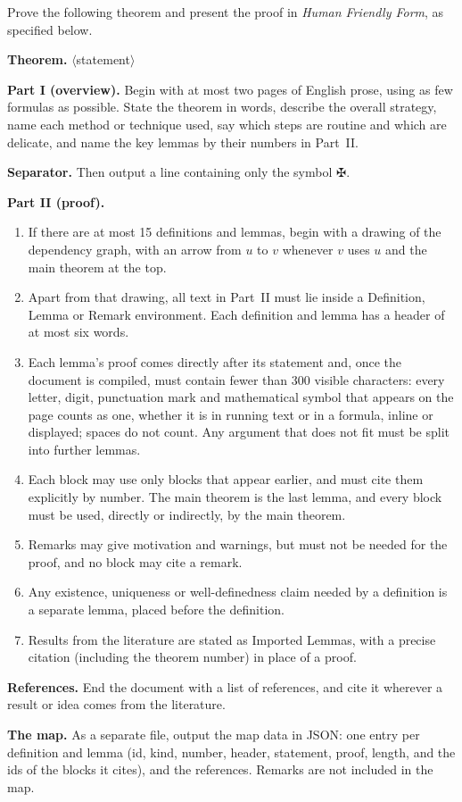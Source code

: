 \documentclass[11pt]{article}
\theoremstyle{plain}
\theoremstyle{definition}
\theoremstyle{remark}
\theoremstyle{definition}
\theoremstyle{plain}
\theoremstyle{remark}
\begin{document}
\begin{tcolorbox}[enhanced, breakable, colback=black!3, colframe=black!40, boxrule=0.5pt, arc=2pt, title={\small\textbf{Prompt template}}, coltitle=black, colbacktitle=black!10, fontupper=\small]
Prove the following theorem and present the proof in \emph{Human Friendly Form}, as specified below.

\smallskip
\textbf{Theorem.} $\langle$statement$\rangle$

\smallskip
\textbf{Part I (overview).} Begin with at most two pages of English prose, using as few formulas as possible. State the theorem in words, describe the overall strategy, name each method or technique used, say which steps are routine and which are delicate, and name the key lemmas by their numbers in Part~II.

\smallskip
\textbf{Separator.} Then output a line containing only the symbol $\maltese$.

\smallskip
\textbf{Part II (proof).}
\begin{enumerate}[leftmargin=1.6em, itemsep=1pt]
  \item If there are at most 15 definitions and lemmas, begin with a drawing of the dependency graph, with an arrow from $u$ to $v$ whenever $v$ uses $u$ and the main theorem at the top.
  \item Apart from that drawing, all text in Part~II must lie inside a Definition, Lemma or Remark environment. Each definition and lemma has a header of at most six words.
  \item Each lemma's proof comes directly after its statement and, once the document is compiled, must contain fewer than 300 visible characters: every letter, digit, punctuation mark and mathematical symbol that appears on the page counts as one, whether it is in running text or in a formula, inline or displayed; spaces do not count. Any argument that does not fit must be split into further lemmas.
  \item Each block may use only blocks that appear earlier, and must cite them explicitly by number. The main theorem is the last lemma, and every block must be used, directly or indirectly, by the main theorem.
  \item Remarks may give motivation and warnings, but must not be needed for the proof, and no block may cite a remark.
  \item Any existence, uniqueness or well-definedness claim needed by a definition is a separate lemma, placed before the definition.
  \item Results from the literature are stated as Imported Lemmas, with a precise citation (including the theorem number) in place of a proof.
\end{enumerate}

\smallskip
\textbf{References.} End the document with a list of references, and cite it wherever a result or idea comes from the literature.

\smallskip
\textbf{The map.} As a separate file, output the map data in JSON: one entry per definition and lemma (id, kind, number, header, statement, proof, length, and the ids of the blocks it cites), and the references. Remarks are not included in the map.
\end{tcolorbox}
\end{document}
